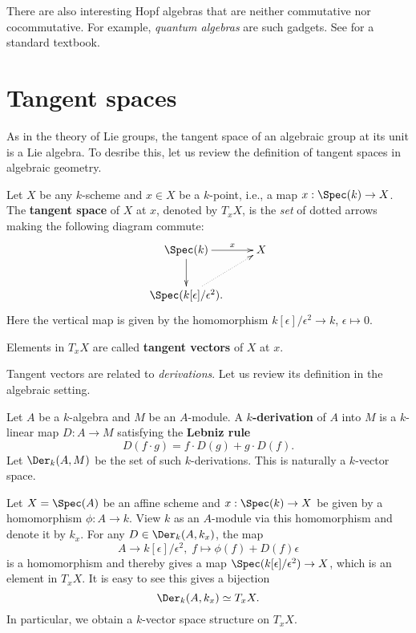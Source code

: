 \begin{rem}
	There are also interesting Hopf algebras that are neither commutative nor cocommutative. For example, \emph{quantum algebras} are such gadgets. See \cite{L} for a standard textbook.
\end{rem}


\section{Tangent spaces}

	As in the theory of Lie groups, the tangent space of an algebraic group at its unit is a Lie algebra. To desribe this, let us review the definition of tangent spaces in algebraic geometry.

\begin{defn}
	Let $X$ be any $k$-scheme and $x\in X$ be a $k$-point, i.e., a map $x: \Spec(k) \to X$. The \textbf{tangent space} of $X$ at $x$, denoted by $T_xX$, is the \emph{set} of dotted arrows making the following diagram commute:
	\[
		\xymatrix{
			\Spec(k) \ar[r]^-x \ar[d]
			& X \\
			\Spec(k[\epsilon]/\epsilon^2). \ar@{.>}[ru]
		}
	\]
	Here the vertical map is given by the homomorphism $k[\epsilon]/\epsilon^2 \to k$, $\epsilon\mapsto 0$.

	Elements in $T_xX$ are called \textbf{tangent vectors} of $X$ at $x$.
\end{defn}


	Tangent vectors are related to \emph{derivations}. Let us review its definition in the algebraic setting.

\begin{defn}
	Let $A$ be a $k$-algebra and $M$ be an $A$-module. A \textbf{$k$-derivation} of $A$ into $M$ is a $k$-linear map $D:A\to M$ satisfying the \textbf{Lebniz rule}
	\[
		D(f\cdot g) = f\cdot D (g) + g\cdot D (f).
	\]
	Let $\Der_k(A,M)$ be the set of such $k$-derivations. This is naturally a $k$-vector space.
\end{defn}

\begin{constr}
	Let $X=\Spec(A)$ be an affine scheme and $x:\Spec(k) \to X$ be given by a homomorphism $\phi:A\to k$. View $k$ as an $A$-module via this homomorphism and denote it by $k_x$. For any $D\in \Der_k(A,k_x)$, the map 
	\[
		A\to k[\epsilon]/\epsilon^2,\; f\mapsto \phi(f)+D(f)\epsilon
	\]
	is a homomorphism and thereby gives a map $\Spec(k[\epsilon]/\epsilon^2) \to X$, which is an element in $T_x X$. It is easy to see this gives a bijection
	\[
		\Der_k(A,k_x) \simeq T_x X.
	\]
	In particular, we obtain a $k$-vector space structure on $T_x X$.

\end{constr}


